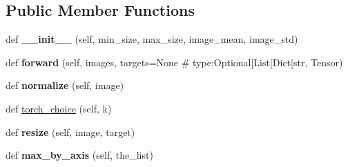\subsection*{Public Member Functions}
\begin{DoxyCompactItemize}
\item 
\mbox{\label{classtorchvision_1_1models_1_1detection_1_1transform_1_1GeneralizedRCNNTransform_a92a78db5ce9740d47bc0e68c7e3925d4}} 
def {\bfseries \+\_\+\+\_\+init\+\_\+\+\_\+} (self, min\+\_\+size, max\+\_\+size, image\+\_\+mean, image\+\_\+std)
\item 
\mbox{\label{classtorchvision_1_1models_1_1detection_1_1transform_1_1GeneralizedRCNNTransform_a226b87560f306f2b17d0568707ecd795}} 
def {\bfseries forward} (self, images, targets=None \# type\+:\+Optional\mbox{[}List\mbox{[}Dict\mbox{[}str, Tensor)
\item 
\mbox{\label{classtorchvision_1_1models_1_1detection_1_1transform_1_1GeneralizedRCNNTransform_a28fe84fad4454540042e4b24cf942222}} 
def {\bfseries normalize} (self, image)
\item 
def \hyperlink{classtorchvision_1_1models_1_1detection_1_1transform_1_1GeneralizedRCNNTransform_abc8554160a0d2c71f41cb54f52487b10}{torch\+\_\+choice} (self, k)
\item 
\mbox{\label{classtorchvision_1_1models_1_1detection_1_1transform_1_1GeneralizedRCNNTransform_ada03710571239d224c7df7eccd79a9bf}} 
def {\bfseries resize} (self, image, target)
\item 
\mbox{\label{classtorchvision_1_1models_1_1detection_1_1transform_1_1GeneralizedRCNNTransform_ae07fbaad31796f0ae0aeac8aff6f924e}} 
def {\bfseries max\+\_\+by\+\_\+axis} (self, the\+\_\+list)
\item 
\mbox{\label{classtorchvision_1_1models_1_1detection_1_1transform_1_1GeneralizedRCNNTransform_a7bc6f6607749e424706a64860396d6ea}} 

\end{DoxyCompactItemize}
